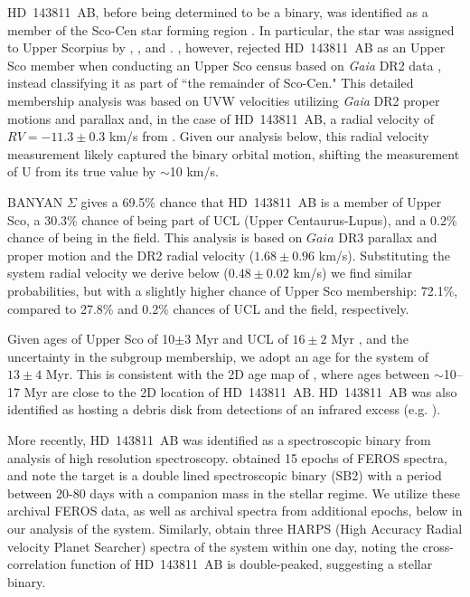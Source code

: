 \documentclass[]{aastex701} %
\begin{document}
HD~143811~AB, before being determined to be a binary, was identified as a member of the Sco-Cen star forming region \citep{dezeeuw:1999}. In particular, the star was assigned to Upper Scorpius by \citet{dezeeuw:1999}, \citet{pecaut:2012}, and \citet{galli:2018}. \citet{luhman:2020}, however, rejected HD~143811~AB as an Upper Sco member when conducting an Upper Sco census based on \textit{Gaia} DR2 data \citep{gaiadr2}, instead classifying it as part of ``the remainder of Sco-Cen." This detailed membership analysis was based on UVW velocities utilizing \textit{Gaia} DR2 proper motions and parallax and, in the case of HD~143811~AB, a radial velocity of $RV = -11.3 \pm 0.3$ km/s from \citet{chen:2011}. Given our analysis below, this radial velocity measurement likely captured the binary orbital motion, shifting the measurement of U from its true value by $\sim$10 km/s.

BANYAN $\Sigma$ \citep{gagne:2018} gives a 69.5\% chance that HD~143811~AB is a member of Upper Sco, a 30.3\% chance of being part of UCL (Upper Centaurus-Lupus), and a 0.2\% chance of being in the field. This analysis is based on $Gaia$ DR3 \citep{GaiaDR3} parallax and proper motion and the DR2 \citep{gaiadr2} radial velocity ($1.68 \pm 0.96$ km/s). Substituting the system radial velocity we derive below ($0.48 \pm 0.02$ km/s) we find similar probabilities, but with a slightly higher chance of Upper Sco membership: 72.1\%, compared to 27.8\% and 0.2\% chances of UCL and the field, respectively.

Given ages of Upper Sco of 10$\pm$3 Myr and UCL of $16 \pm 2$ Myr \citep{pecaut:2012}, and the uncertainty in the subgroup membership, we adopt an age for the system of $13 \pm 4$ Myr. This is consistent with the 2D age map of \citet{pecaut:2016}, where ages between $\sim$10--17 Myr are close to the 2D location of HD~143811~AB. HD~143811~AB was also identified as hosting a debris disk from detections of an infrared excess (e.g. \citealt{chen:2011}).

More recently, HD~143811~AB was identified as a spectroscopic binary from analysis of high resolution spectroscopy. \citet{zakhozhay:2022} obtained 15 epochs of FEROS spectra, and note the target is a double lined spectroscopic binary (SB2) with a period between 20-80 days with a companion mass in the stellar regime. We utilize these archival FEROS data, as well as archival spectra from additional epochs, below in our analysis of the system. Similarly, \citet{grandjean:2023} obtain three HARPS (High Accuracy Radial velocity Planet Searcher) spectra of the system within one day, noting the cross-correlation function of HD~143811~AB is double-peaked, suggesting a stellar binary.
\end{document}
